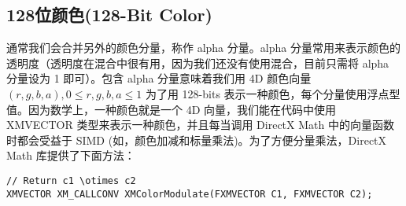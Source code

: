 \subsection{128位颜色(128-Bit Color)}
\begin{flushleft}
通常我们会合并另外的颜色分量，称作 alpha 分量。alpha 分量常用来表示颜色的透明度（透明度在混合中很有用，因为我们还没有使用混合，目前只需将 alpha 分量设为 1 即可）。包含 alpha 分量意味着我们用 4D 颜色向量$(r, g, b, a), 0 \leq r,g,b,a \leq 1$ 为了用 128-bits 表示一种颜色，每个分量使用浮点型值。因为数学上，一种颜色就是一个 4D 向量，我们能在代码中使用 XMVECTOR 类型来表示一种颜色，并且每当调用 DirectX Math 中的向量函数时都会受益于 SIMD (如，颜色加减和标量乘法)。为了方便分量乘法，DirectX Math 库提供了下面方法：
\begin{lstlisting}
// Return c1 \otimes c2
XMVECTOR XM_CALLCONV XMColorModulate(FXMVECTOR C1, FXMVECTOR C2);
\end{lstlisting}
\end{flushleft}

